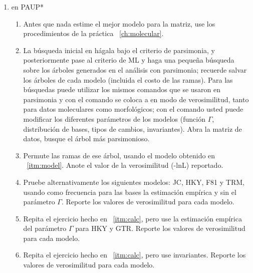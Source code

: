 \begin{enumerate} 
 \item{en PAUP*}
	\begin{enumerate} 
		\item \label{itm:model} Antes que nada estime el mejor modelo para la matriz, use los procedimientos de la pr\'actica ~\ref{ch:molecular}. 

		
		\item \label{itm:calc} La b\'usqueda inicial en  h\'agala bajo
      el criterio de parsimonia, y posteriormente pase al criterio de ML y haga
      una \textrm{peque\~na} b\'usqueda sobre los \'arboles generados en el
      an\'alisis con parsimonia; recuerde salvar los \'arboles de cada modelo
      (incluida el costo de las ramas). Para las b\'usquedas puede utilizar los
      mismos comandos que se usaron en parsimonia y con el comando  se coloca a  en modo de
      verosimilitud, tanto para datos moleculares como morfol\'ogicos; con el comando  usted puede modificar los diferentes par\'ametros de los modelos (funci\'on $\Gamma$, distribuci\'on de bases, tipos de cambios, invariantes). Abra la matriz de datos, busque el \'arbol m\'as parsimonioso.
		\item Permute las ramas de ese \'arbol, usando el modelo obtenido en ~\ref{itm:model}. Anote el valor de la verosimilitud (-lnL) reportado.
		\item  Pruebe alternativamente los siguientes modelos: JC, HKY, F81 y TRM, usando como frecuencia para las bases la estimaci\'on emp\'irica y sin el par\'ametro $\Gamma$. Reporte los valores de verosimilitud para cada modelo.


		\item Repita el ejercicio hecho en ~\ref{itm:calc}, pero use la estimaci\'on emp\'irica del par\'ametro $\Gamma$ para HKY y GTR. Reporte los valores de verosimilitud para cada modelo.
		
		\item Repita el ejercicio hecho en ~\ref{itm:calc}, pero use invariantes. Reporte los valores de verosimilitud para cada modelo.
	\end{enumerate}


\end{enumerate}
